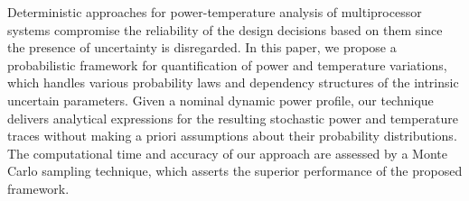Deterministic approaches for power-temperature analysis of multiprocessor systems compromise the reliability of the design decisions based on them since the presence of uncertainty is disregarded. In this paper, we propose a probabilistic framework for quantification of power and temperature variations, which handles various probability laws and dependency structures of the intrinsic uncertain parameters. Given a nominal dynamic power profile, our technique delivers analytical expressions for the resulting stochastic power and temperature traces without making a priori assumptions about their probability distributions. The computational time and accuracy of our approach are assessed by a Monte Carlo sampling technique, which asserts the superior performance of the proposed framework.
